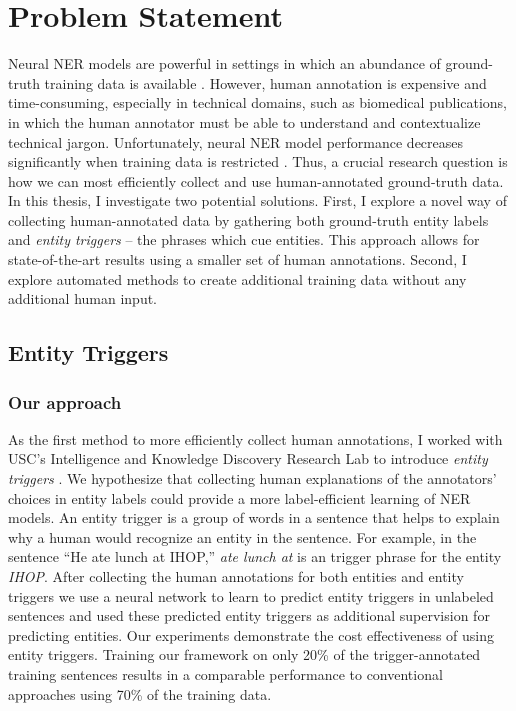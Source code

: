 \section{Problem Statement}
Neural NER models are powerful in settings in which an abundance of ground-truth training data is available \citep{LampleNER}. However, human annotation is expensive and time-consuming, especially in technical domains, such as biomedical publications, in which the human annotator must be able to understand and contextualize technical jargon. Unfortunately, neural NER model performance decreases significantly when training data is restricted \citep{TriggerNER}. Thus, a crucial research question is how we can most efficiently collect and use human-annotated ground-truth data. In this thesis, I investigate two potential solutions. First, I explore a novel way of collecting human-annotated data by gathering both ground-truth entity labels and \textit{entity triggers} -- the phrases which cue entities. This approach allows for state-of-the-art results using a smaller set of human annotations. Second, I explore automated methods to create additional training data without any additional human input.

\subsection{Entity Triggers}
\subsubsection{Our approach}
As the first method to more efficiently collect human annotations, I worked with USC's Intelligence and Knowledge Discovery Research Lab to introduce \textit{entity triggers} \citep{TriggerNER}. We hypothesize that collecting human explanations of the annotators' choices in entity labels could provide a more label-efficient learning of NER models. An entity trigger is a group of words in a sentence that helps to explain why a human would recognize an entity in the sentence. For example, in the sentence ``He ate lunch at IHOP,'' \textit{ate lunch at} is an trigger phrase for the entity \textit{IHOP}. After collecting the human annotations for both entities and entity triggers we use a neural network to learn to predict entity triggers in unlabeled sentences and used these predicted entity triggers as additional supervision for predicting entities. Our experiments demonstrate the cost effectiveness of using entity triggers. Training our framework on only 20\% of the trigger-annotated training sentences results in a comparable performance to conventional approaches using 70\% of the training data.

